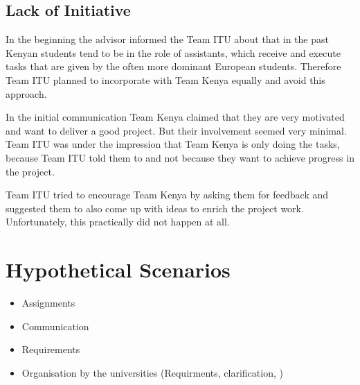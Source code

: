 
\subsection{Lack of Initiative}
\label{sec:initiative_lack}

In the beginning the advisor informed the Team ITU about that in the past Kenyan students tend to be in the role of assistants, which receive and execute tasks that are given by the often more dominant European students. Therefore Team ITU planned to incorporate with Team Kenya equally and avoid this approach.

In the initial communication Team Kenya claimed that they are very motivated and want to deliver a good project. But their involvement seemed very minimal. Team ITU was under the impression that Team Kenya is only doing the tasks, because Team ITU told them to and not because they want to achieve progress in the project.

Team ITU tried to encourage Team Kenya by asking them for feedback and suggested them to also come up with ideas to enrich the project work. Unfortunately, this practically did not happen at all.





\section{Hypothetical Scenarios}


	\begin{itemize}
		\item Assignments
		\item Communication
		\item Requirements
		\item Organisation by the universities (Requirments, clarification, )
	\end{itemize}
